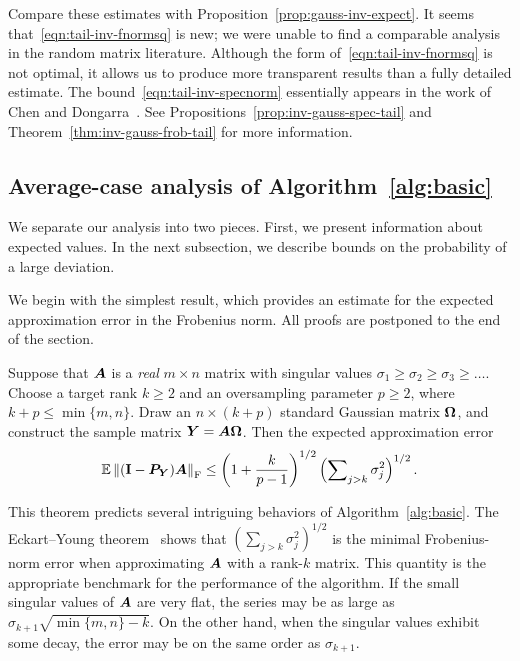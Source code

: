 \documentclass[final]{siamltex}
\newcounter{algorithm}[section]
\newcommand{\notate}[1]{\textcolor{red}{\textbf{[#1]}}}
\begin{document}

Compare these estimates with Proposition~\ref{prop:gauss-inv-expect}.
It seems that~\eqref{eqn:tail-inv-fnormsq} is new;
we were unable to find a comparable analysis in the random matrix
literature.  Although the form of~\eqref{eqn:tail-inv-fnormsq} is not optimal,
it allows us to produce more transparent results than
a fully detailed estimate.  The bound~\eqref{eqn:tail-inv-specnorm}
essentially appears in the work of Chen and Dongarra~\cite{CD05:Condition-Numbers}.
See Propositions~\ref{prop:inv-gauss-spec-tail} and Theorem~\ref{thm:inv-gauss-frob-tail}
for more information.


\subsection{Average-case analysis of Algorithm~\ref{alg:basic}}
    \label{sec:gauss-avg-case}

We separate our analysis into two pieces.
First, we present information about expected values.
In the next subsection, we describe bounds on the probability of a large deviation.


We begin with the simplest result, which provides an
estimate for the expected approximation error in the Frobenius
norm.  All proofs are postponed to the end of the section.

\lsp

\begin{theorem} \label{thm:avg-frob-error-gauss}
Suppose that $\bm{A}$ is a \emph{real} $m \times n$ matrix with
singular values $\sigma_1 \geq \sigma_2 \geq \sigma_3 \geq \dots$.
Choose a target rank $k \geq 2$ and an oversampling parameter $p \geq 2$,
where $k + p \leq \min\{m,n\}$.  Draw an $n \times (k+p)$ standard
Gaussian matrix $\bm{\Omega}$, and construct the sample matrix $\bm{Y} =
\bm{A\Omega}$.  Then the expected approximation error
$$
\operatorname{\mathbb{E}} \left\Vert {(\mathbf{I}- \bm{P}_{\bm{Y}}) \bm{A}} \right\Vert_{\mathrm{F}}
    \leq \left( 1 + \frac{k}{p-1} \right)^{1/2}
    \left( \sum\nolimits_{j>k} \sigma_j^2 \right)^{1/2}.
$$
\end{theorem}


This theorem predicts several intriguing behaviors
of Algorithm~\ref{alg:basic}.
The Eckart--Young theorem~\cite{EY36:Approximation-One} shows that
$(\sum\nolimits_{j > k} \sigma_j^2 )^{1/2}$ is the minimal Frobenius-norm
error when approximating $\bm{A}$ with a rank-$k$ matrix.  This quantity
is the appropriate benchmark for the performance of the algorithm.
If the small singular values of $\bm{A}$ are very flat,
the series may be as large as $\sigma_{k+1} \sqrt{\min\{m,n\} - k}$.  On the
other hand, when the singular values exhibit some decay, the error may
be on the same order as $\sigma_{k+1}$.
\end{document}
